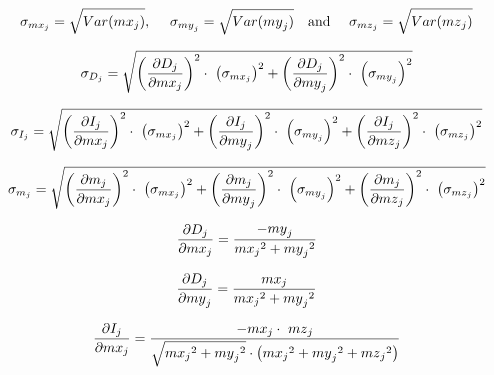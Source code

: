 \documentclass[manuscript,revised]{geophysics}
\begin{document}
\bigskip


\begin{equation} \label{eq:sphere20}
\centering
\sigma_{{mx}_j}=\sqrt{Var({mx}_j)},\ \ \ \  \sigma_{{my}_j}=\sqrt{Var({my}_j)}\ \ \ \text{and}\ \ \ \  \sigma_{{mz}_j}=\sqrt{Var({mz}_j)}
\end{equation}


\begin{equation} \label{eq:sphere21}
\centering
\sigma_{D_j}=\sqrt{\left(\frac{\partial D_j}{\partial{mx}_j}\right)^2\cdot\ \left(\sigma_{{mx}_j}\right)^2+\left(\frac{\partial D_j}{\partial{my}_j}\right)^2\cdot\ \left(\sigma_{{my}_j}\right)^2}
\end{equation}

\begin{equation} \label{eq:sphere22}
\centering
\sigma_{I_j}=\sqrt{\left(\frac{\partial I_j}{\partial{mx}_j}\right)^2\cdot\ \left(\sigma_{{mx}_j}\right)^2+\left(\frac{\partial I_j}{\partial{my}_j}\right)^2\cdot\ \left(\sigma_{{my}_j}\right)^2+\left(\frac{\partial I_j}{\partial{mz}_j}\right)^2\cdot\ \left(\sigma_{{mz}_j}\right)^2}
\end{equation}

\begin{equation} \label{eq:sphere22_m}
\centering
\sigma_{m_j}=\sqrt{\left(\frac{\partial m_j}{\partial{mx}_j}\right)^2\cdot\ \left(\sigma_{{mx}_j}\right)^2+\left(\frac{\partial m_j}{\partial{my}_j}\right)^2\cdot\ \left(\sigma_{{my}_j}\right)^2+\left(\frac{\partial m_j}{\partial{mz}_j}\right)^2\cdot\ \left(\sigma_{{mz}_j}\right)^2}
\end{equation}


\begin{equation} \label{eq:sphere23}
\centering
\frac{\partial D_j}{\partial{mx}_j}=\frac{-{my}_j}{{{mx}_j}^2+{{my}_j}^2}
\end{equation}

\begin{equation} \label{eq:sphere24}
\centering
\frac{\partial D_j}{\partial{my}_j}=\frac{{mx}_j}{{{mx}_j}^2+{{my}_j}^2}
\end{equation}

\begin{equation} \label{eq:sphere25}
\centering
\frac{\partial I_j}{\partial{mx}_j}=\frac{-{mx}_j\cdot \ {mz}_j}{\sqrt{{{mx}_j}^2+{{my}_j}^2}\cdot \left({{mx}_j}^2+{{my}_j}^2+{{mz}_j}^2\right)}
\end{equation}
\end{document}
